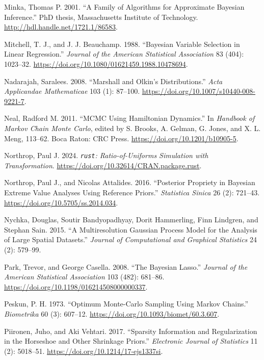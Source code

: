 \documentclass[
  11pt,
  letterpaper,
]{scrbook}
\newlength{\cslhangindent}
\newenvironment{CSLReferences}[2] %
 {\begin{list}{}{%
  \setlength{\itemindent}{0pt}
  \setlength{\leftmargin}{0pt}
  \setlength{\parsep}{0pt}
  \ifodd #1
   \setlength{\leftmargin}{\cslhangindent}
   \setlength{\itemindent}{-1\cslhangindent}
  \fi
  \setlength{\itemsep}{#2\baselineskip}}}
 {\end{list}}
\theoremstyle{definition}
\theoremstyle{plain}
\theoremstyle{plain}
\theoremstyle{plain}
\theoremstyle{definition}
\theoremstyle{definition}
\theoremstyle{remark}
\begin{document}
\begin{CSLReferences}{1}{0}
Minka, Thomas P. 2001. {``A Family of Algorithms for Approximate
{B}ayesian Inference.''} PhD thesis, Massachusetts Institute of
Technology. \url{http://hdl.handle.net/1721.1/86583}.

Mitchell, T. J., and J. J. Beauchamp. 1988. {``Bayesian Variable
Selection in Linear Regression.''} \emph{Journal of the American
Statistical Association} 83 (404): 1023--32.
\url{https://doi.org/10.1080/01621459.1988.10478694}.

Nadarajah, Saralees. 2008. {``{M}arshall and {O}lkin's Distributions.''}
\emph{Acta Applicandae Mathematicae} 103 (1): 87--100.
\url{https://doi.org/10.1007/s10440-008-9221-7}.

Neal, Radford M. 2011. {``{MCMC} Using {H}amiltonian Dynamics.''} In
\emph{Handbook of {M}arkov Chain {M}onte {C}arlo}, edited by S. Brooks,
A. Gelman, G. Jones, and X. L. Meng, 113--62. Boca Raton: CRC Press.
\url{https://doi.org/10.1201/b10905-5}.

Northrop, Paul J. 2024. \emph{\texttt{rust}: Ratio-of-Uniforms
Simulation with Transformation}.
\url{https://doi.org/10.32614/CRAN.package.rust}.

Northrop, Paul J., and Nicolas Attalides. 2016. {``Posterior Propriety
in {B}ayesian Extreme Value Analyses Using Reference Priors.''}
\emph{Statistica Sinica} 26 (2): 721--43.
\url{https://doi.org/10.5705/ss.2014.034}.

Nychka, Douglas, Soutir Bandyopadhyay, Dorit Hammerling, Finn Lindgren,
and Stephan Sain. 2015. {``A Multiresolution {G}aussian Process Model
for the Analysis of Large Spatial Datasets.''} \emph{Journal of
Computational and Graphical Statistics} 24 (2): 579--99.

Park, Trevor, and George Casella. 2008. {``The {B}ayesian {L}asso.''}
\emph{Journal of the American Statistical Association} 103 (482):
681--86. \url{https://doi.org/10.1198/016214508000000337}.

Peskun, P. H. 1973. {``Optimum {M}onte-{C}arlo Sampling Using {M}arkov
Chains.''} \emph{Biometrika} 60 (3): 607--12.
\url{https://doi.org/10.1093/biomet/60.3.607}.

Piironen, Juho, and Aki Vehtari. 2017. {``Sparsity Information and
Regularization in the Horseshoe and Other Shrinkage Priors.''}
\emph{Electronic Journal of Statistics} 11 (2): 5018--51.
\url{https://doi.org/10.1214/17-ejs1337si}.


\end{CSLReferences}
\end{document}
